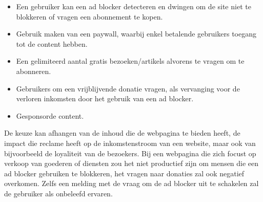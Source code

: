 \documentclass[pdftex,a4paper,12pt,twoside]{report}
\begin{document}
\begin{itemize}
	\item Een gebruiker kan een ad blocker detecteren en dwingen om de site niet te blokkeren of vragen een abonnement te kopen.
	\item Gebruik maken van een paywall, waarbij enkel betalende gebruikers toegang tot de content hebben.
	\item Een gelimiteerd aantal gratis bezoeken/artikels alvorens te vragen om te abonneren.
	\item Gebruikers om een vrijblijvende donatie vragen, als vervanging voor de verloren inkomsten door het gebruik van een ad blocker.
	\item Gesponsorde content.	
\end{itemize}

De keuze kan afhangen van de inhoud die de webpagina te bieden heeft, de impact die reclame heeft op de inkomstenstroom van een website, maar ook van bijvoorbeeld de loyaliteit van de bezoekers. Bij een webpagina die zich focust op verkoop van goederen of diensten zou het niet productief zijn om mensen die een ad blocker gebruiken te blokkeren, het vragen naar donaties zal ook negatief overkomen. Zelfs een melding met de vraag om de ad blocker uit te schakelen zal de gebruiker als onbeleefd ervaren.
\end{document}
